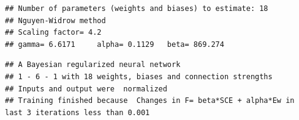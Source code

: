 \begin{verbatim}
## Number of parameters (weights and biases) to estimate: 18 
## Nguyen-Widrow method
## Scaling factor= 4.2 
## gamma= 6.6171     alpha= 0.1129   beta= 869.274
\end{verbatim}

\begin{verbatim}
## A Bayesian regularized neural network 
## 1 - 6 - 1 with 18 weights, biases and connection strengths
## Inputs and output were  normalized
## Training finished because  Changes in F= beta*SCE + alpha*Ew in last 3 iterations less than 0.001
\end{verbatim}

